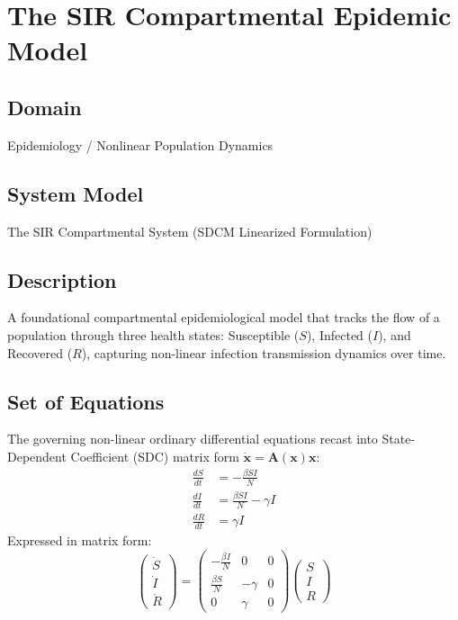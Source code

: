 \chapter{The SIR Compartmental Epidemic Model}

\section{Domain}
Epidemiology / Nonlinear Population Dynamics

\section{System Model}
The SIR Compartmental System (SDCM Linearized Formulation)

\section{Description}
A foundational compartmental epidemiological model that tracks the flow of a population through three health states: Susceptible ($S$), Infected ($I$), and Recovered ($R$), capturing non-linear infection transmission dynamics over time.

\section{Set of Equations}
The governing non-linear ordinary differential equations recast into State-Dependent Coefficient (SDC) matrix form $\dot{\mathbf{x}} = \mathbf{A}(\mathbf{x})\mathbf{x}$:
\begin{align}
\frac{dS}{dt} &= -\frac{\beta S I}{N} \\
\frac{dI}{dt} &= \frac{\beta S I}{N} - \gamma I \\
\frac{dR}{dt} &= \gamma I
\end{align}
Expressed in matrix form:
\begin{equation}
\begin{pmatrix} \dot{S} \\ \dot{I} \\ \dot{R} \end{pmatrix} = \begin{pmatrix} -\frac{\beta I}{N} & 0 & 0 \\ \frac{\beta S}{N} & -\gamma & 0 \\ 0 & \gamma & 0 \end{pmatrix} \begin{pmatrix} S \\ I \\ R \end{pmatrix}
\end{equation}

